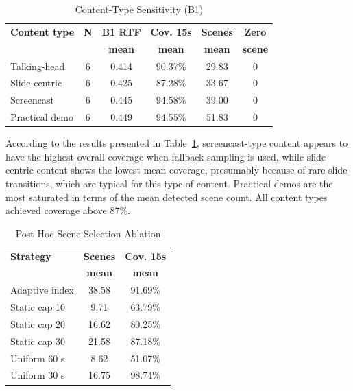 \documentclass[conference]{IEEEtran}
\begin{document}
\begin{table}[t]
\caption{Content-Type Sensitivity (B1)}
\label{tab:content_sensitivity}
\centering
\footnotesize
\setlength{\tabcolsep}{4.2pt}
\begin{tabular}{lccccc}
\toprule
\textbf{Content type} & \textbf{N} & \textbf{B1 RTF} & \textbf{Cov. 15s} & \textbf{Scenes} & \textbf{Zero} \\
 &  & \textbf{mean} & \textbf{mean} & \textbf{mean} & \textbf{scene} \\
\midrule
Talking-head & 6 & 0.414 & 90.37\% & 29.83 & 0 \\
Slide-centric & 6 & 0.425 & 87.28\% & 33.67 & 0 \\
Screencast & 6 & 0.445 & 94.58\% & 39.00 & 0 \\
Practical demo & 6 & 0.449 & 94.55\% & 51.83 & 0 \\
\bottomrule
\end{tabular}
\end{table}

According to the results presented in Table~\ref{tab:content_sensitivity}, screencast-type content appears to have the highest overall coverage when fallback sampling is used, while slide-centric content shows the lowest mean coverage, presumably because of rare slide transitions, which are typical for this type of content. Practical demos are the most saturated in terms of the mean detected scene count. All content types achieved coverage above 87\%.

\begin{table}[t]
\caption{Post Hoc Scene Selection Ablation}
\label{tab:scene_ablation}
\centering
\footnotesize
\setlength{\tabcolsep}{5pt}
\begin{tabular}{lcc}
\toprule
\textbf{Strategy} & \textbf{Scenes} & \textbf{Cov. 15s} \\
 & \textbf{mean} & \textbf{mean} \\
\midrule
Adaptive index & 38.58 & 91.69\% \\
Static cap 10 & 9.71 & 63.79\% \\
Static cap 20 & 16.62 & 80.25\% \\
Static cap 30 & 21.58 & 87.18\% \\
Uniform 60 s & 8.62 & 51.07\% \\
Uniform 30 s & 16.75 & 98.74\% \\
\bottomrule
\end{tabular}
\end{table}
\end{document}
